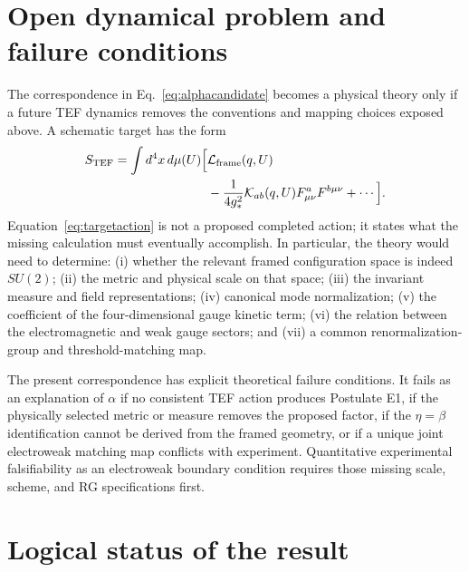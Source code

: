 \documentclass[10pt,twocolumn]{article}
\newcommand{\TEF}{\mathrm{TEF}}
\begin{document}
\section{Open dynamical problem and failure conditions}
\label{sec:dynamics}

The correspondence in Eq.~\eqref{eq:alphacandidate} becomes a physical theory only if a future
TEF dynamics removes the conventions and mapping choices exposed above.  A schematic target has
the form
\begin{align}
S_{\TEF}=\int d^4x\,d\mu(U)\Bigl[
&\mathcal L_{\rm frame}(q,U)\notag\\
&-\frac{1}{4g_*^2}\mathcal K_{ab}(q,U)
F^a_{\mu\nu}F^{b\mu\nu}+\cdots\Bigr].
\label{eq:targetaction}
\end{align}
Equation~\eqref{eq:targetaction} is not a proposed completed action; it states what the missing
calculation must eventually accomplish.  In particular, the theory would need to determine:
(i) whether the relevant framed configuration space is indeed $SU(2)$;
(ii) the metric and physical scale on that space;
(iii) the invariant measure and field representations;
(iv) canonical mode normalization;
(v) the coefficient of the four-dimensional gauge kinetic term;
(vi) the relation between the electromagnetic and weak gauge sectors; and
(vii) a common renormalization-group and threshold-matching map.

The present correspondence has explicit theoretical failure conditions.  It fails as an explanation
of $\alpha$ if no consistent TEF action produces Postulate E1, if the physically selected metric or
measure removes the proposed factor, if the $\eta=\beta$ identification cannot be derived from the
framed geometry, or if a unique joint electroweak matching map conflicts with experiment.
Quantitative experimental falsifiability as an electroweak boundary condition requires those missing
scale, scheme, and RG specifications first.

\section{Logical status of the result}
\end{document}
